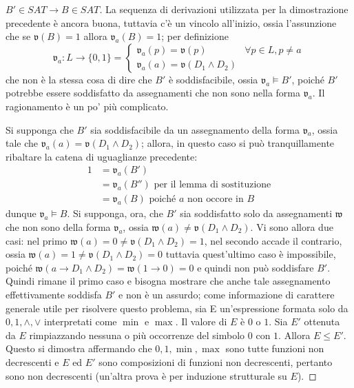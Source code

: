 \begin{proof}[$B' \in SAT \rightarrow B \in SAT$]
        La sequenza di derivazioni utilizzata per la dimostrazione precedente 
        è ancora buona, tuttavia c'è un vincolo all'inizio, 
        ossia l'assunzione che se $\mathfrak{v}(B) = 1$ allora $\mathfrak{v}_a(B) = 1$; 
        per definizione 
        $$
        \mathfrak{v}_a: L \rightarrow \{0,1\} = 
        \begin{cases}
                \mathfrak{v}_a(p) = \mathfrak{v}(p) & \forall p \in L, p \neq a \\
                \mathfrak{v}_a(a) = \mathfrak{v}(D_1 \land D_2) 
        \end{cases} 
        $$
        che non è la stessa cosa di dire che $B'$ è soddisfacibile, 
        ossia $\mathfrak{v}_a \models B'$, poiché $B'$ potrebbe essere soddisfatto 
        da assegnamenti che non sono nella forma $\mathfrak{v}_a$. Il ragionamento 
        è un po' più complicato. 

        Si supponga che $B'$ sia soddisfacibile da un assegnamento della forma 
        $\mathfrak{v}_a$, ossia tale che $\mathfrak{v}_a(a) = \mathfrak{v}(D_1 \land D_2)$; 
        allora, in questo caso si può tranquillamente ribaltare la catena di uguaglianze 
        precedente: 
        \begin{align*}
                1 &= \mathfrak{v}_a(B') \\
                  &= \mathfrak{v}_a(B'') \text{ per il lemma di sostituzione}  \\
                  &= \mathfrak{v}_a(B) \text { poiché } a \text{ non occore in } B 
        \end{align*}
        dunque $\mathfrak{v}_a \models B$. 
        Si supponga, ora, che $B'$ sia soddisfatto solo da assegnamenti 
        $\mathfrak{w}$ che non sono della forma $\mathfrak{v}_a$, 
        ossia $\mathfrak{w}(a) \neq \mathfrak{v}(D_1 \land D_2)$. 
        Vi sono allora due casi: nel primo $\mathfrak{w}(a)= 0 \neq \mathfrak{v}(D_1 \land D_2) =  1$, 
        nel secondo accade il contrario, ossia 
        $\mathfrak{w}(a) = 1 \neq \mathfrak{v}(D_1 \land D_2) = 0$ tuttavia 
        quest'ultimo caso è impossibile, poiché 
        $\mathfrak{w}(a \rightarrow D_1 \land D_2) = \mathfrak{w}(1 \rightarrow 0) = 0$
        e quindi non può soddisfare $B'$. Quindi rimane 
        il primo caso e bisogna mostrare che anche 
        tale assegnamento effettivamente soddisfa $B'$ e non è un assurdo; come 
        informazione di carattere generale utile per risolvere 
        questo problema, sia E un'espressione formata solo da $0, 1, \land, \lor$ 
        interpretati come $\min$ e $\max$. Il valore di $E$ è $0$ o $1$. 
        Sia $E'$ ottenuta da $E$ rimpiazzando nessuna o più occorrenze 
        del simbolo $0$ con $1$. Allora $E \leq E'$. Questo si dimostra 
        affermando che $0, 1, \min, \max$ sono tutte funzioni 
        non decrescenti e $E$ ed $E'$ sono composizioni di funzioni 
        non decrescenti, pertanto sono non decrescenti (un'altra prova è 
        per induzione strutturale su $E$).


\end{proof}
